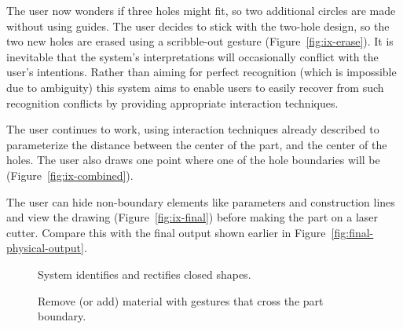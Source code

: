 \documentclass[11pt]{article}
\begin{document}
The user now wonders if three holes might fit, so two additional
circles are made without using guides. The user decides to stick with
the two-hole design, so the two new holes are erased using a
scribble-out gesture (Figure~\ref{fig:ix-erase}). It is inevitable
that the system's interpretations will occasionally conflict with the
user's intentions. Rather than aiming for perfect recognition (which
is impossible due to ambiguity) this system aims to enable users to
easily recover from such recognition conflicts by providing
appropriate interaction techniques.

The user continues to work, using interaction techniques already
described to parameterize the distance between the center of the part,
and the center of the holes. The user also draws one point where one
of the hole boundaries will be (Figure~\ref{fig:ix-combined}).

The user can hide non-boundary elements like parameters and
construction lines and view the drawing (Figure~\ref{fig:ix-final})
before making the part on a laser cutter. Compare this with the final
output shown earlier in Figure~\ref{fig:final-physical-output}.

\newpage
{}
\twocolumn

\begin{figure}[] 
\centering
{} 
\caption{System identifies and rectifies closed shapes.}
\label{fig:ix-draw-bounds}
\end{figure}

\begin{figure}[] 
\centering
{} 
\caption{Remove (or add) material with gestures that cross the part
  boundary.}
\label{fig:ix-remove-from-edge}
\end{figure}
\end{document}
